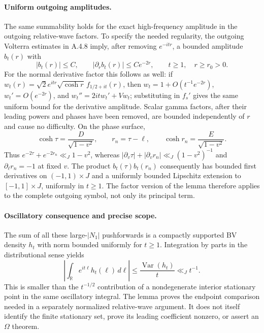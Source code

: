 \paragraph{Uniform outgoing amplitudes.}
The same summability holds for the exact high-frequency amplitude
in the outgoing relative-wave factors.  To specify the needed
regularity, the outgoing Volterra estimates in A.4.8 imply, after
removing $e^{-itr}$, a bounded amplitude $b_t(r)$ with
\[
 |b_t(r)|\leq C,\qquad |\partial_r b_t(r)|\leq Ce^{-2r},
 \qquad t\geq1,\quad r\geq r_0>0.
\]
For the normal derivative factor this follows as well: if
$w_t(r)=\sqrt2e^{itr}\sqrt{\cosh r}\,f_{1/2+it}(r)$,
then $w_t=1+O(t^{-1}e^{-2r})$, $w_t'=O(e^{-2r})$, and
$w_t''=2itw_t'+Vw_t$; substituting in $f_s'$ gives the same
uniform bound for the derivative amplitude.  Scalar gamma factors,
after their leading powers and phases have been removed, are
bounded independently of $r$ and cause no difficulty.
On the phase surface,
\[
 \cosh\tau=\frac{D}{\sqrt{1-v^2}},\qquad
 r_n=\tau-\ell,\qquad
 \cosh r_n=\frac{E}{\sqrt{1-v^2}}.
\]
Thus $e^{-2\tau}+e^{-2r_n}\ll_J1-v^2$, whereas
$|\partial_v\tau|+|\partial_v r_n|\ll_J(1-v^2)^{-1}$
and $\partial_\ell r_n=-1$ at fixed $v$.
The product $b_t(\tau)b_t(r_n)$ consequently has bounded first
derivatives on $(-1,1)\times J$ and a uniformly bounded Lipschitz
extension to $[-1,1]\times J$, uniformly in $t\geq1$.
The factor version of the lemma therefore applies to the complete
outgoing symbol, not only its principal term.

\paragraph{Oscillatory consequence and precise scope.}
The sum of all these large-$|N_1|$ pushforwards is a compactly
supported BV density $h_t$ with norm bounded uniformly for $t\geq1$.
Integration by parts in the distributional sense yields
\[
 \left|\int_{\mathbb R}e^{it\ell}h_t(\ell)\,d\ell\right|
 \leq\frac{\operatorname{Var}(h_t)}{t}\ll_J t^{-1}.
\]
This is smaller than the $t^{-1/2}$ contribution of a nondegenerate
interior stationary point in the same oscillatory integral.
The lemma proves the endpoint comparison needed in a separately
normalized relative-wave argument.  It does not itself identify
the finite stationary set, prove its leading coefficient nonzero,
or assert an $\Omega$ theorem.
